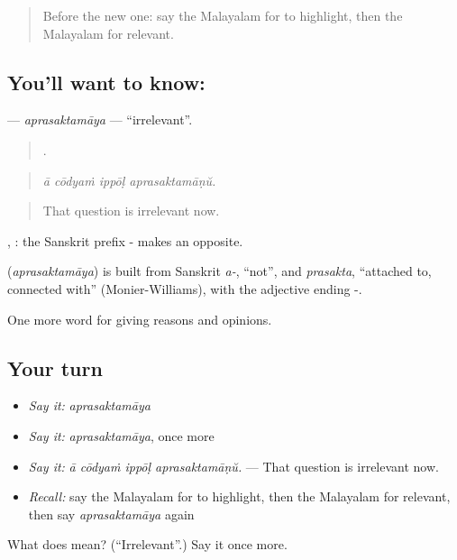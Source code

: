 \begin{quote}
Before the new one: say the Malayalam for to highlight, then the Malayalam for relevant.
\end{quote}

\subsection*{You'll want to know: }
\textbf{} — \emph{aprasaktamāya} — \textquotedblleft{}irrelevant\textquotedblright{}.

\begin{quote}
   .
\end{quote}

\begin{quote}
\emph{ā cōdyaṁ ippōḷ aprasaktamāṇŭ.}
\end{quote}

\begin{quote}
That question is irrelevant now.
\end{quote}

, : the Sanskrit prefix - makes an opposite.

\begin{cousinweb}
\textbf{} (\emph{aprasaktamāya}) is built from Sanskrit \emph{a-}, \textquotedblleft{}not\textquotedblright{}, and \emph{prasakta}, \textquotedblleft{}attached to, connected with\textquotedblright{} (Monier-Williams), with the adjective ending -.
\end{cousinweb}

\begin{grammarlens}[title={What you've built}]
One more word for giving reasons and opinions.
\end{grammarlens}

\subsection*{Your turn}
\begin{itemize}
\raggedright
  \item \emph{Say it:} \emph{aprasaktamāya}
  \item \emph{Say it:} \emph{aprasaktamāya}, once more
  \item \emph{Say it:} \emph{ā cōdyaṁ ippōḷ aprasaktamāṇŭ.} — That question is irrelevant now.
  \item \emph{Recall:} say the Malayalam for to highlight, then the Malayalam for relevant, then say \emph{aprasaktamāya} again
\end{itemize}

\begin{tcolorbox}[breakable,colback=teal!4,colframe=teal!35!black,title={Before you move on}]
What does  mean? (\textquotedblleft{}Irrelevant\textquotedblright{}.) Say it once more.
\end{tcolorbox}
